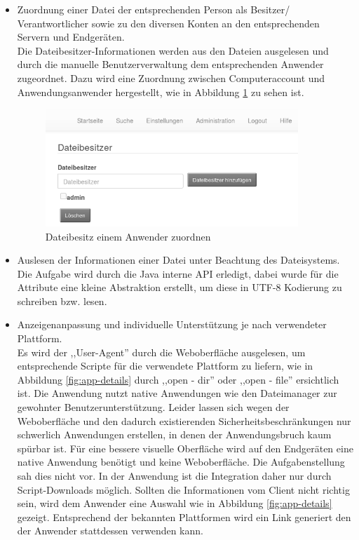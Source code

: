 \documentclass[oneside, ngerman, toc=bibliography,bibliography=totoc,listof=entryprefix, open=right,numbers=noenddot,fontsize=12pt]{scrbook}
\begin{document}
\begin{itemize}
     \item Zuordnung einer Datei der entsprechenden Person als Besitzer/ Verantwortlicher sowie zu den diversen Konten an den entsprechenden Servern und Endgeräten. \\
    Die Dateibesitzer-Informationen werden aus den Dateien ausgelesen und durch die manuelle Benutzerverwaltung dem entsprechenden Anwender zugeordnet. Dazu wird eine Zuordnung zwischen Computeraccount und Anwendungsanwender hergestellt, wie in  Abbildung \ref{fig:app-cfg-datei} zu sehen ist.
    \begin{figure}[htbp] 
        \centering
        \includegraphics[width=0.9\textwidth]{Masterarbeit_Bilder/einstellungen_dateibesitzer.png}
        \caption{Dateibesitz einem Anwender zuordnen}
        \label{fig:app-cfg-datei}
    \end{figure}  
    
    
    \item Auslesen der Informationen einer Datei unter Beachtung des Dateisystems.\\
    Die Aufgabe wird durch die Java interne API erledigt, dabei wurde für die Attribute eine kleine Abstraktion erstellt, um diese in UTF-8 Kodierung zu schreiben bzw. lesen. 
    
       
    \item Anzeigenanpassung und individuelle Unterstützung je nach verwendeter Plattform.\\
    Es wird  der ,,User-Agent'' durch die Weboberfläche ausgelesen, um entsprechende Scripte für die verwendete Plattform zu liefern, wie in Abbildung \ref{fig:app-details} durch ,,open - dir'' oder ,,open - file'' ersichtlich ist.
    Die Anwendung nutzt native Anwendungen wie den Dateimanager zur gewohnter Benutzerunterstützung. Leider lassen sich wegen der Weboberfläche und den dadurch existierenden Sicherheitsbeschränkungen nur schwerlich  Anwendungen erstellen, in denen der Anwendungsbruch kaum spürbar ist. Für eine bessere visuelle Oberfläche wird auf den Endgeräten eine native Anwendung benötigt und keine Weboberfläche. Die Aufgabenstellung sah dies nicht vor. In der Anwendung ist die Integration daher nur durch Script-Downloads möglich. 
    Sollten die Informationen vom Client nicht richtig sein, wird dem Anwender eine Auswahl wie in Abbildung \ref{fig:app-details} gezeigt. Entsprechend der bekannten Plattformen wird ein Link generiert den der Anwender stattdessen verwenden kann.
    

\end{itemize}
\end{document}
